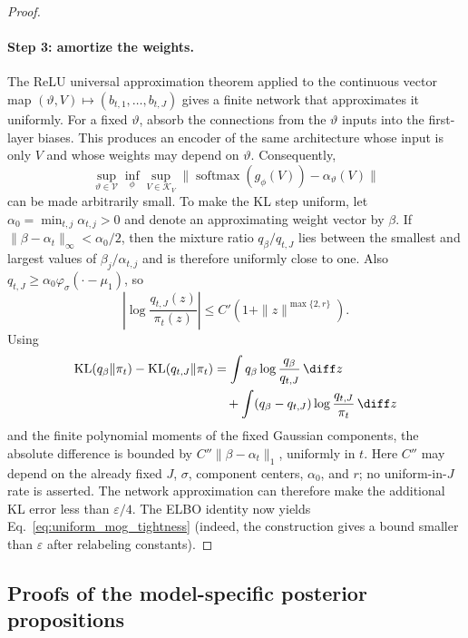 \begin{proof}
\paragraph{Step 3: amortize the weights.}
The ReLU universal approximation theorem applied to the continuous vector
map $(\vartheta,V)\mapsto(b_{t,1},\ldots,b_{t,J})$ gives a finite network that
approximates it uniformly.  For a fixed $\vartheta$, absorb the connections
from the $\vartheta$ inputs into the first-layer biases.  This produces an
encoder of the same architecture whose input is only $V$ and whose weights
may depend on $\vartheta$.  Consequently,
\[
 \sup_{\vartheta\in\mathcal V}\inf_\phi
 \sup_{V\in\mathcal K_V}
 \|\operatorname{softmax}(g_\phi(V))-\alpha_\vartheta(V)\|
\]
can be made arbitrarily small.  To make the KL step uniform, let
$\alpha_0=\min_{t,j}\alpha_{t,j}>0$ and denote an approximating weight vector
by $\beta$.  If $\|\beta-\alpha_t\|_\infty<\alpha_0/2$, then the mixture ratio
$q_\beta/q_{t,J}$ lies between the smallest and largest values of
$\beta_j/\alpha_{t,j}$ and is therefore uniformly close to one.  Also
$q_{t,J}\ge\alpha_0\varphi_\sigma(\cdot-\mu_1)$, so
\[
 \left|\log\frac{q_{t,J}(z)}{\pi_t(z)}\right|
 \le C'(1+\|z\|^{\max\{2,r\}}).
\]
Using
\begin{align*}
 \mathrm{KL}(q_\beta\|\pi_t)-\mathrm{KL}(q_{t,J}\|\pi_t)
 &=\int q_\beta\log\frac{q_\beta}{q_{t,J}}\,\diff z\\
 &\quad+\int(q_\beta-q_{t,J})
 \log\frac{q_{t,J}}{\pi_t}\,\diff z
\end{align*}
and the finite polynomial moments of the fixed Gaussian components, the
absolute difference is bounded by
$C''\|\beta-\alpha_t\|_1$, uniformly in $t$.  Here $C''$ may depend on the
already fixed $J$, $\sigma$, component centers, $\alpha_0$, and $r$; no
uniform-in-$J$ rate is asserted.  The network approximation can therefore
make the additional KL error less than $\varepsilon/4$.  The ELBO identity
now yields
Eq.~\eqref{eq:uniform_mog_tightness} (indeed, the construction gives a bound
smaller than $\varepsilon$ after relabeling constants).
\end{proof}

\subsection{Proofs of the model-specific posterior propositions}

